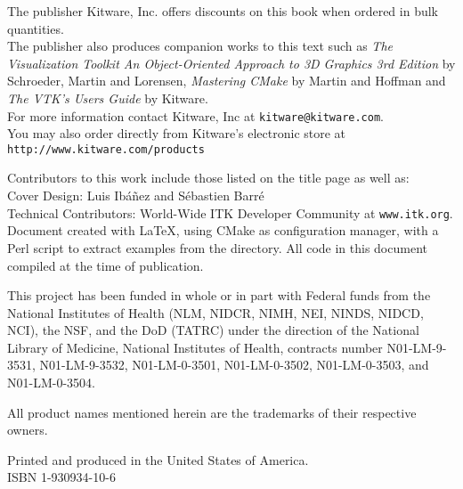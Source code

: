 \begin{minipage}[t][3.0cm][b]{\textwidth}
\begin{center}
The publisher Kitware, Inc. offers discounts on this book when ordered in
bulk quantities.\\
The publisher also produces companion works to this text such as \emph{The
Visualization Toolkit An Object-Oriented Approach to 3D Graphics 3rd Edition}
by Schroeder, Martin and Lorensen, \emph{Mastering CMake} by Martin and
Hoffman and \emph{The VTK's Users Guide} by Kitware.\\
For more information contact Kitware, Inc at \texttt{kitware@kitware.com}.\\
You may also order directly from Kitware's electronic store at
\texttt{http://www.kitware.com/products}\\
\end{center}
\end{minipage}

\begin{minipage}[t][2.5cm][b]{\textwidth}
\begin{center}
Contributors to this work include those listed on the title page as well
as:\\ Cover Design: Luis Ib\'{a}\~{n}ez and S\'{e}bastien Barr\'{e}\\
Technical Contributors: World-Wide ITK Developer Community at
\texttt{www.itk.org}. \\Document created with \LaTeX{}, using CMake as
configuration manager, with a Perl script to extract examples from the
 directory. All code in this document compiled at
the time of publication.
\end{center}
\end{minipage}


\begin{minipage}[t][2.5cm][b]{\textwidth}
\begin{center}
This project has been funded in whole or in part with Federal funds from the
National Institutes of Health (NLM, NIDCR, NIMH, NEI, NINDS, NIDCD, NCI), the
NSF, and the DoD (TATRC) under the direction of the National Library of
Medicine, National Institutes of Health, contracts number N01-LM-9-3531,
N01-LM-9-3532, N01-LM-0-3501, N01-LM-0-3502, N01-LM-0-3503, and
N01-LM-0-3504.
\end{center}
\end{minipage}


\begin{minipage}[t][1.5cm][b]{\textwidth}
\begin{center}
All product names mentioned herein are the trademarks of their respective 
owners.
\end{center}
\end{minipage}


\begin{minipage}[t][1.5cm][b]{\textwidth}
\begin{center}
Printed and produced in the United States of America.\\
ISBN 1-930934-10-6
\end{center}
\end{minipage}
